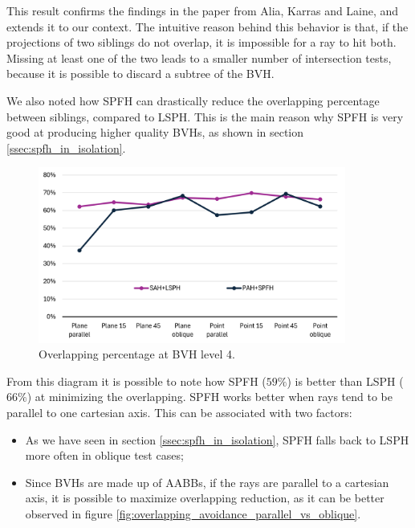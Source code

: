 \documentclass{PoliMi_MasterThesis}
\begin{document}
This result confirms the findings in the paper from Alia, Karras and Laine, and extends it to our context. The intuitive reason behind this behavior is that, if the projections of two siblings do not overlap, it is impossible for a ray to hit both. Missing at least one of the two leads to a smaller number of intersection tests, because it is possible to discard a subtree of the BVH.

We also noted how SPFH can drastically reduce the overlapping percentage between siblings, compared to LSPH. This is the main reason why SPFH is very good at producing higher quality BVHs, as shown in section \ref{ssec:spfh_in_isolation}.

\begin{figure}[H] 
	\centering
	\includegraphics[width=0.9\textwidth]{Images/siblings_overlapping_spfh_vs_lsph.png}
	\caption{Overlapping percentage at BVH level 4.}
	\label{fig:pah_overlapping_children}
\end{figure}

From this diagram it is possible to note how SPFH ($59\%$) is better than LSPH ($66\%$) at minimizing the overlapping. SPFH works better when rays tend to be parallel to one cartesian axis. This can be associated with two factors: 
\begin{itemize}
	\item As we have seen in section \ref{ssec:spfh_in_isolation}, SPFH falls back to LSPH more often in oblique test cases;
	\item Since BVHs are made up of AABBs, if the rays are parallel to a cartesian axis, it is possible to maximize overlapping reduction, as it can be better observed in figure \ref{fig:overlapping_avoidance_parallel_vs_oblique}.
\end{itemize}
\end{document}
